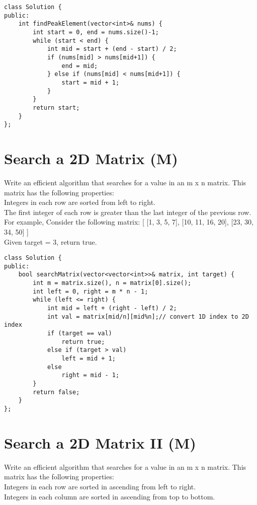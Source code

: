 \begin{lstlisting}
class Solution {
public:
    int findPeakElement(vector<int>& nums) {
        int start = 0, end = nums.size()-1;
        while (start < end) {
            int mid = start + (end - start) / 2;
            if (nums[mid] > nums[mid+1]) {
                end = mid;
            } else if (nums[mid] < nums[mid+1]) {
                start = mid + 1;
            }
        }
        return start;
    }
};
\end{lstlisting}


\section{Search a 2D Matrix (M)}
Write an efficient algorithm that searches for a value in an m x n matrix. This matrix has the following properties:\\
    Integers in each row are sorted from left to right.\\
    The first integer of each row is greater than the last integer of the previous row.\\

For example,
Consider the following matrix:
[
  [1,   3,  5,  7],
  [10, 11, 16, 20],
  [23, 30, 34, 50]
]\\
Given target = 3, return true.\\

\begin{lstlisting}
class Solution {
public:
    bool searchMatrix(vector<vector<int>>& matrix, int target) {
        int m = matrix.size(), n = matrix[0].size();
        int left = 0, right = m * n - 1;
        while (left <= right) {
            int mid = left + (right - left) / 2;
            int val = matrix[mid/n][mid%n];// convert 1D index to 2D index
            if (target == val)
                return true;
            else if (target > val)
                left = mid + 1;
            else
                right = mid - 1;
        }
        return false;
    }
};
\end{lstlisting}


\section{Search a 2D Matrix II (M)}
Write an efficient algorithm that searches for a value in an m x n matrix. This matrix has the following properties:\\
    Integers in each row are sorted in ascending from left to right.\\
    Integers in each column are sorted in ascending from top to bottom.\\

